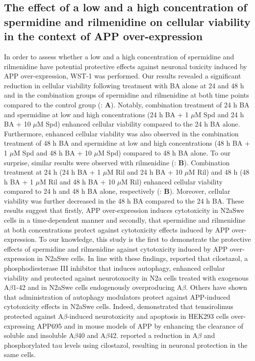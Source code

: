 \subsection{The effect of a low and a high concentration of spermidine and rilmenidine on cellular viability in the context of APP over-expression}
In order to assess whether a low and a high concentration of spermidine and rilmenidine have potential protective effects against neuronal toxicity induced by APP over-expression, WST-1 was performed. Our results revealed a significant reduction in cellular viability following treatment with BA alone at 24 and 48 h and in the combination groups of spermidine and rilmenidine at both time points compared to the control group (: \textbf{A}). Notably, combination treatment of 24 h BA and spermidine at low and high concentrations (24 h BA + 1 $\mu$M Spd and 24 h BA + 10 $\mu$M Spd) enhanced cellular viability compared to the 24 h BA alone. Furthermore, enhanced cellular viability was also observed in the combination treatment of 48 h BA and spermidine at low and high concentrations (48 h BA + 1 $\mu$M Spd and 48 h BA + 10 $\mu$M Spd) compared to 48 h BA alone. To our surprise, similar results were observed with rilmenidine (: \textbf{B}). Combination treatment at 24 h (24 h BA + 1 $\mu$M Ril and 24 h BA + 10 $\mu$M Ril) and 48 h (48 h BA + 1 $\mu$M Ril and 48 h BA + 10 $\mu$M Ril) enhanced cellular viability compared to 24 h and 48 h BA alone, respectively (: \textbf{B}). Moreover, cellular viability was further decreased in the 48 h BA compared to the 24 h BA. These results suggest that firstly, APP over-expression induces cytotoxicity in N2aSwe cells in a time-dependent manner and secondly, that spermidine and rilmenidine at both concentrations protect against cytotoxicity effects induced by APP over-expression. To our knowledge, this study is the first to demonstrate the protective effects of spermidine and rilmenidine against cytotoxicity induced by APP over-expression in N2aSwe cells. In line with these findings, \citet{Lee2015} reported that cilostazol, a phosphodiesterase III inhibitor that induces autophagy, enhanced cellular viability and protected against neurotoxocity in N2a cells treated with exogenous A$\beta$1-42 and in N2aSwe cells endogenously overproducing A$\beta$. Others have shown that administration of autophagy modulators protect against APP-induced cytotoxicity effects in N2aSwe cells. Indeed, \citet{Jiang2014a} demonstrated that temsirolimus protected against A$\beta$-induced neurotoxicity and apoptosis in HEK293 cells over-expressing APP695 and in mouse models of APP by enhancing the clearance of soluble and insoluble A$\beta$40 and A$\beta$42. \citet{Park2011} reported a reduction in A$\beta$ and phosphorylated tau levels using cilostazol, resulting in neuronal protection in the same cells.

